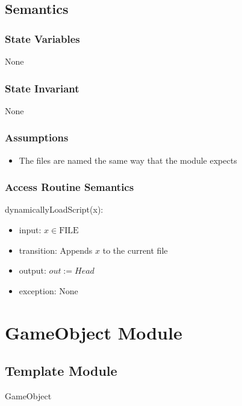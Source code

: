 \documentclass[12pt]{article}
\begin{document}
\subsection* {Semantics}

\subsubsection* {State Variables}

None

\subsubsection* {State Invariant}

None

\subsubsection* {Assumptions}

\begin{itemize}
    \item The files are named the same way that the module expects
\end{itemize}

\subsubsection* {Access Routine Semantics}

\noindent dynamicallyLoadScript(x):
\begin{itemize}
    \item input: $x \in \mbox{FILE}$
    \item transition: Appends $x$ to the current file
    \item output: $out := Head$
    \item exception: None
\end{itemize}


\newpage

\section*{GameObject Module}

\subsection*{Template Module}

GameObject
\end{document}
